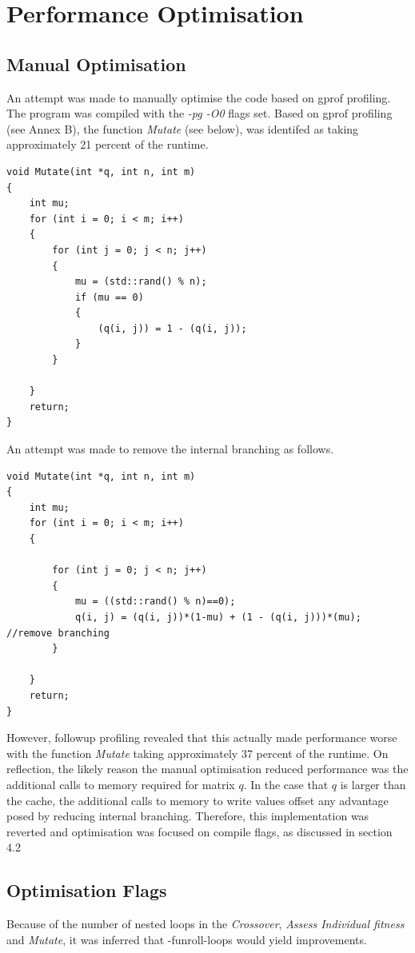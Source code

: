\documentclass{report}
\begin{document}
\newpage
\section{Performance Optimisation}

\subsection{Manual Optimisation}
An attempt was made to manually optimise the code based on gprof profiling. The program was compiled with the \textit{-pg -O0} flags set. Based on gprof profiling (see Annex B), the function \textit{Mutate} (see below), was identifed as taking approximately 21 percent of the runtime. 
\begin{lstlisting}
void Mutate(int *q, int n, int m)
{
    int mu;
    for (int i = 0; i < m; i++)
    {
        for (int j = 0; j < n; j++)
        {
            mu = (std::rand() % n);
            if (mu == 0)
            {
                (q(i, j)) = 1 - (q(i, j));
            }
        }

    }
    return;
}
\end{lstlisting}
An attempt was made to remove the internal branching as follows. 
\begin{lstlisting}
void Mutate(int *q, int n, int m)
{
    int mu;
    for (int i = 0; i < m; i++)
    {
        
        for (int j = 0; j < n; j++)
        {
            mu = ((std::rand() % n)==0);
            q(i, j) = (q(i, j))*(1-mu) + (1 - (q(i, j)))*(mu); //remove branching
        }

    }
    return;
}
\end{lstlisting}
However, followup profiling revealed that this actually made performance worse with the function \textit{Mutate} taking approximately 37 percent of the runtime. \cbstart On reflection, the likely reason the manual optimisation reduced performance was the additional calls to memory required for matrix \(q\). In the case that \(q\) is larger than the cache, the additional calls to memory to write values offset any advantage posed by reducing internal branching.  \cbend Therefore, this implementation was reverted and optimisation was focused on compile flags, as discussed in section 4.2


\subsection{Optimisation Flags}
Because of the number of nested loops in the \textit{Crossover}, \textit{Assess Individual fitness} and \textit{Mutate}, it was inferred that -funroll-loops would yield improvements.
\end{document}
